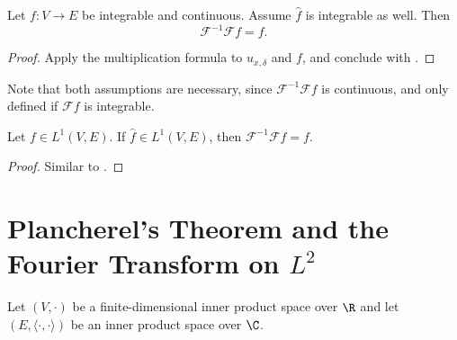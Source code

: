 \begin{theorem}
  \label{thm:fourier-inversion}
  Let $f:V\to E$ be integrable and continuous. Assume $\widehat f$ is integrable as well. Then
  $$\mathcal F^{-1}\mathcal F f=f.$$
  \leanok
\end{theorem}
\begin{proof}
  \leanok
  Apply the multiplication formula  to $u_{x,\delta}$ and $f$, and conclude with
  .
\end{proof}

\begin{remark}
  Note that both assumptions are necessary, since $\mathcal F^{-1}\mathcal Ff$ is continuous, and
  only defined if $\mathcal Ff$ is integrable.
\end{remark}

\begin{theorem}
  \label{thm:fourier-inversion-L1}
  \leanok
  Let $f\in L^1(V,E)$. If $\widehat f\in L^1(V,E)$, then $\mathcal F^{-1}\mathcal Ff=f$.
\end{theorem}
\begin{proof}
  \leanok
  Similar to .
\end{proof}

\section{\texorpdfstring{Plancherel's Theorem and the Fourier Transform on $L^2$}
                        {Plancherel's Theorem and the Fourier Transform on L2}}
Let $(V,\cdot)$ be a finite-dimensional inner product space over $\R$ and let $(E,\langle\cdot,\cdot\rangle)$ be an inner product space over $\C$.

